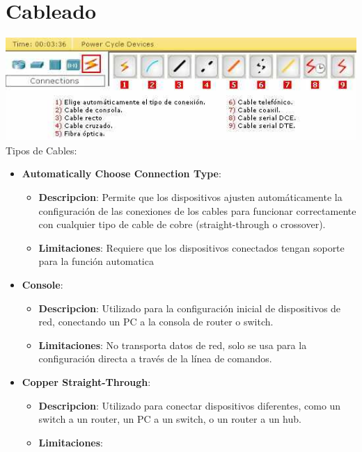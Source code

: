 \documentclass{article}
\begin{document}
    \section{Cableado}
       \includegraphics[width=\textwidth]{img/Cables Packet Tracer.PNG}
        Tipos de Cables:
        
        \begin{itemize}
            \item\textbf{Automatically Choose Connection Type}: 
                \begin{itemize}
                    \item\textbf{Descripcion}:  Permite que los dispositivos ajusten automáticamente la configuración de las conexiones de los cables para funcionar correctamente con cualquier tipo de cable de cobre (straight-through o crossover).
                    \item\textbf{Limitaciones}:
                    Requiere que los dispositivos conectados tengan soporte para la función automatica
                \end{itemize}   
            \item\textbf{Console}: 
                \begin{itemize}
                    \item\textbf{Descripcion}: Utilizado para la configuración inicial de dispositivos de red, conectando un PC a la consola de router o switch.
                    \item\textbf{Limitaciones}: 
                    No transporta datos de red, solo se usa para la configuración directa a través de la línea de comandos.
                \end{itemize} 
            \item\textbf{Copper Straight-Through}: 
                \begin{itemize}
                    \item\textbf{Descripcion}:
                    Utilizado para conectar dispositivos diferentes, como un switch a un router, un PC a un switch, o un router a un hub.
                    \item\textbf{Limitaciones}:

\end{itemize}
\end{itemize}
\end{document}
